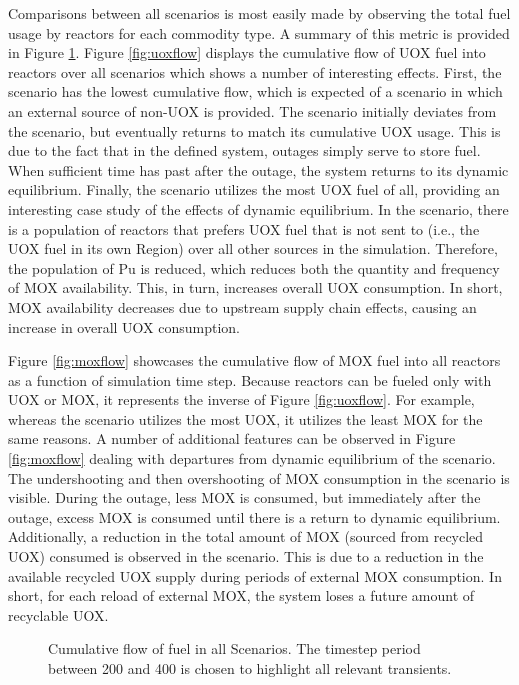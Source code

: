 Comparisons between all scenarios is most easily made by observing the total
fuel usage by reactors for each commodity type. A summary of this metric is
provided in Figure \ref{fig:flows}. Figure \ref{fig:uoxflow} displays the
cumulative flow of UOX fuel into reactors over all scenarios which shows a
number of interesting effects. First, the \external scenario has the lowest
cumulative flow, which is expected of a scenario in which an external source of
non-UOX is provided.  The \outage scenario initially deviates from the \basecase
scenario, but eventually returns to match its cumulative UOX usage. This is due
to the fact that in the defined system, outages simply serve to store fuel. When
sufficient time has past after the outage, the system returns to its dynamic
equilibrium. Finally, the \tariff scenario utilizes the most UOX fuel of all,
providing an interesting case study of the effects of dynamic equilibrium. In
the \tariff scenario, there is a population of reactors that prefers UOX fuel
that is not sent to \separations (i.e., the UOX fuel in its own Region) over all
other sources in the simulation. Therefore, the population of Pu is reduced,
which reduces both the quantity and frequency of MOX availability. This, in
turn, increases overall UOX consumption. In short, MOX availability decreases
due to upstream supply chain effects, causing an increase in overall UOX
consumption.

Figure \ref{fig:moxflow} showcases the cumulative flow of MOX fuel into all
reactors as a function of simulation time step. Because reactors can be fueled
only with UOX or MOX, it represents the inverse of Figure \ref{fig:uoxflow}. For
example, whereas the \tariff scenario utilizes the most UOX, it utilizes the
least MOX for the same reasons. A number of additional features can be observed
in Figure \ref{fig:moxflow} dealing with departures from dynamic equilibrium of
the \basecase scenario. The undershooting and then overshooting of MOX
consumption in the \outage scenario is visible. During the outage, less MOX is
consumed, but immediately after the outage, excess MOX is consumed until there
is a return to dynamic equilibrium. Additionally, a reduction in the total
amount of MOX (sourced from recycled UOX) consumed is observed in the \external
scenario. This is due to a reduction in the available recycled UOX supply during
periods of external MOX consumption. In short, for each reload of external MOX,
the system loses a future amount of recyclable UOX.

\begin{figure}
  \centering
  \begin{minipage}{0.9\textwidth}
    \centering
    \vfill
  \end{minipage}%
  \caption[]{
    \label{fig:flows}
    Cumulative flow of fuel in all Scenarios. The timestep period between 200
    and 400 is chosen to highlight all relevant transients. }
\end{figure}


